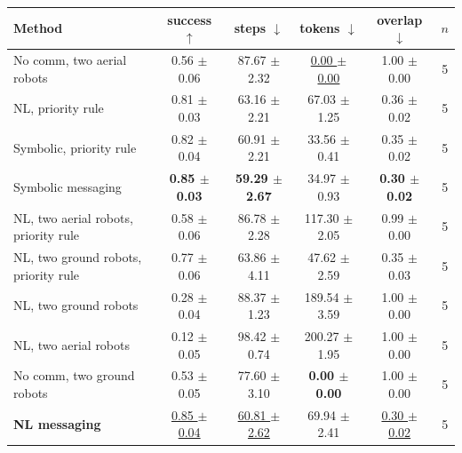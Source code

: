 \begin{tabular}{lccccc}
\toprule
Method & success $\uparrow$ & steps $\downarrow$ & tokens $\downarrow$ & overlap $\downarrow$ & $n$ \\
\midrule
No comm, two aerial robots & 0.56 $\pm$ 0.06 & 87.67 $\pm$ 2.32 & \underline{0.00 $\pm$ 0.00} & 1.00 $\pm$ 0.00 & 5 \\
NL, priority rule & 0.81 $\pm$ 0.03 & 63.16 $\pm$ 2.21 & 67.03 $\pm$ 1.25 & 0.36 $\pm$ 0.02 & 5 \\
Symbolic, priority rule & 0.82 $\pm$ 0.04 & 60.91 $\pm$ 2.21 & 33.56 $\pm$ 0.41 & 0.35 $\pm$ 0.02 & 5 \\
Symbolic messaging & \textbf{0.85 $\pm$ 0.03} & \textbf{59.29 $\pm$ 2.67} & 34.97 $\pm$ 0.93 & \textbf{0.30 $\pm$ 0.02} & 5 \\
NL, two aerial robots, priority rule & 0.58 $\pm$ 0.06 & 86.78 $\pm$ 2.28 & 117.30 $\pm$ 2.05 & 0.99 $\pm$ 0.00 & 5 \\
NL, two ground robots, priority rule & 0.77 $\pm$ 0.06 & 63.86 $\pm$ 4.11 & 47.62 $\pm$ 2.59 & 0.35 $\pm$ 0.03 & 5 \\
NL, two ground robots & 0.28 $\pm$ 0.04 & 88.37 $\pm$ 1.23 & 189.54 $\pm$ 3.59 & 1.00 $\pm$ 0.00 & 5 \\
NL, two aerial robots & 0.12 $\pm$ 0.05 & 98.42 $\pm$ 0.74 & 200.27 $\pm$ 1.95 & 1.00 $\pm$ 0.00 & 5 \\
No comm, two ground robots & 0.53 $\pm$ 0.05 & 77.60 $\pm$ 3.10 & \textbf{0.00 $\pm$ 0.00} & 1.00 $\pm$ 0.00 & 5 \\
\textbf{NL messaging} & \underline{0.85 $\pm$ 0.04} & \underline{60.81 $\pm$ 2.62} & 69.94 $\pm$ 2.41 & \underline{0.30 $\pm$ 0.02} & 5 \\
\bottomrule
\end{tabular}
